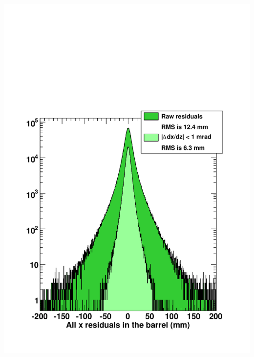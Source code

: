 \documentclass[compress]{beamer}
\begin{document}
\begin{frame}
\begin{columns}
\includegraphics[width=\linewidth]{residuals_explanation.pdf}

\end{columns}
\end{frame}
\end{document}
